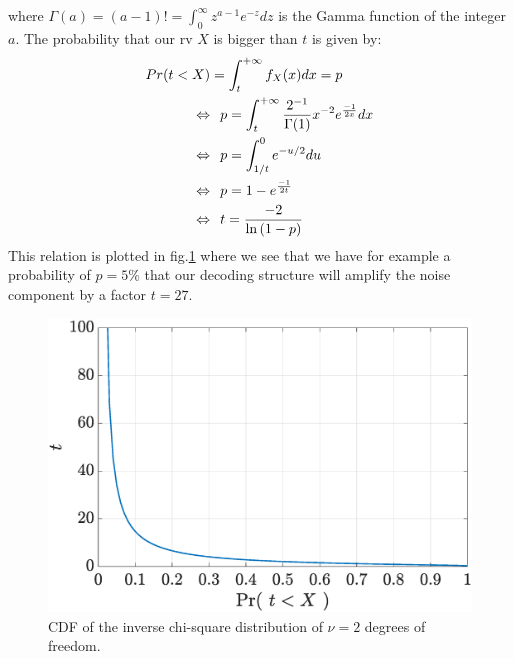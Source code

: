 where $\Gamma(a) = (a-1)! = \int_0^\infty z^{a-1} e^{-z} dz$ is the Gamma function of the integer $a$. The probability that our \gls{rv} $X$ is bigger than $t$ is given by:
\begin{equation}
    \begin{split}
        Pr( t < X ) &= \int_t^{+\infty} f_X(x) dx = p \\
        \Leftrightarrow & \hspace{.1in} p =  \int_t^{+\infty} \frac{2^{-1}}{\Gamma (1)} x^{-2} e^{\frac{-1}{2x}} dx \\
        \Leftrightarrow & \hspace{.1in} p = \int_{1/t}^0 e^{-u/2} du \\
        \Leftrightarrow & \hspace{.1in} p = 1 - e^{\frac{-1}{2t}}\\
        \Leftrightarrow & \hspace{.1in} t = \frac{-2}{\ln{(1-p)}}
    \end{split}
\end{equation}
This relation is plotted in fig.\ref{fig:cdf_inverse_chi_square} where we see that we have for example a probability of $p=5\%$ that our decoding structure will amplify the noise component by a factor $t=27$.
\begin{figure}[htb!]
    \centering
    \centerline{\includegraphics[width = .65\textwidth]{graphs/inverse_chi_square_cdf.eps}}
    \caption{CDF of the inverse chi-square distribution of $\nu = 2$ degrees of freedom.}
    \label{fig:cdf_inverse_chi_square}
\end{figure} 










